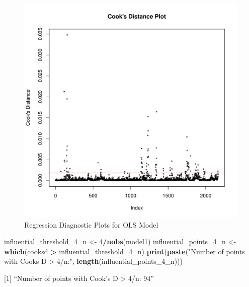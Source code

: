 \documentclass[
]{article}
\newenvironment{Shaded}{\begin{snugshade}}{\end{snugshade}}
\newcommand{\DecValTok}[1]{\textcolor[rgb]{0.00,0.00,0.81}{#1}}
\newcommand{\FunctionTok}[1]{\textcolor[rgb]{0.13,0.29,0.53}{\textbf{#1}}}
\newcommand{\NormalTok}[1]{#1}
\newcommand{\OtherTok}[1]{\textcolor[rgb]{0.56,0.35,0.01}{#1}}
\newcommand{\SpecialCharTok}[1]{\textcolor[rgb]{0.81,0.36,0.00}{\textbf{#1}}}
\newcommand{\StringTok}[1]{\textcolor[rgb]{0.31,0.60,0.02}{#1}}
\begin{document}
\begin{figure}
\centering
\includegraphics{FinalProject_files/figure-latex/model1-diagnostics-5.pdf}
\caption{Regression Diagnostic Plots for OLS Model}
\end{figure}

\begin{Shaded}
\begin{Highlighting}[]
\NormalTok{  influential\_threshold\_4\_n }\OtherTok{\textless{}{-}} \DecValTok{4}\SpecialCharTok{/}\FunctionTok{nobs}\NormalTok{(model1)}
\NormalTok{  influential\_points\_4\_n }\OtherTok{\textless{}{-}} \FunctionTok{which}\NormalTok{(cooksd }\SpecialCharTok{\textgreater{}}\NormalTok{ influential\_threshold\_4\_n)}
  \FunctionTok{print}\NormalTok{(}\FunctionTok{paste}\NormalTok{(}\StringTok{"Number of points with Cook\textquotesingle{}s D \textgreater{} 4/n:"}\NormalTok{, }\FunctionTok{length}\NormalTok{(influential\_points\_4\_n)))}
\end{Highlighting}
\end{Shaded}

{[}1{]} ``Number of points with Cook's D \textgreater{} 4/n: 94''
\end{document}
